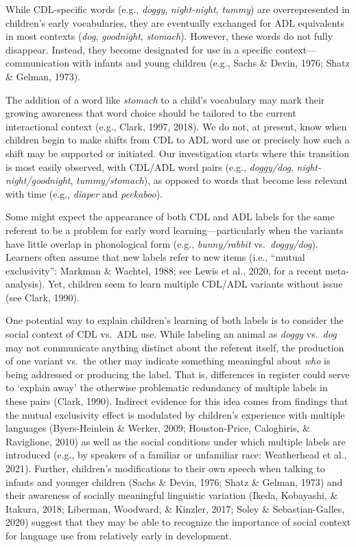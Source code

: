 \documentclass[10pt, letterpaper]{article}
\begin{document}
While CDL-specific words (e.g., \emph{doggy}, \emph{night-night},
\emph{tummy}) are overrepresented in children's early vocabularies, they
are eventually exchanged for ADL equivalents in most contexts
(\emph{dog}, \emph{goodnight}, \emph{stomach}). However, these words do
not fully disappear. Instead, they become designated for use in a
specific context---communication with infants and young children (e.g.,
Sachs \& Devin, 1976; Shatz \& Gelman, 1973).

The addition of a word like \emph{stomach} to a child's vocabulary may
mark their growing awareness that word choice should be tailored to the
current interactional context (e.g., Clark, 1997, 2018). We do not, at
present, know when children begin to make shifts from CDL to ADL word
use or precisely how such a shift may be supported or initiated. Our
investigation starts where this transition is most easily observed, with
CDL/ADL word pairs (e.g., \emph{doggy/dog},
\emph{night-night/goodnight}, \emph{tummy/stomach}), as opposed to words
that become less relevant with time (e.g., \emph{diaper} and
\emph{peekaboo}).

Some might expect the appearance of both CDL and ADL labels for the same
referent to be a problem for early word learning---particularly when the
variants have little overlap in phonological form (e.g.,
\emph{bunny/rabbit} vs.~\emph{doggy/dog}). Learners often assume that
new labels refer to new items (i.e., {``mutual exclusivity''}: Markman
\& Wachtel, 1988; see Lewis et al., 2020, for a recent meta-analysis).
Yet, children seem to learn multiple CDL/ADL variants without issue (see
Clark, 1990).

One potential way to explain children's learning of both labels is to
consider the social context of CDL vs.~ADL use. While labeling an animal
as \emph{doggy} vs.~\emph{dog} may not communicate anything distinct
about the referent itself, the production of one variant vs.~the other
may indicate something meaningful about \emph{who} is being addressed or
producing the label. That is, differences in register could serve to
`explain away' the otherwise problematic redundancy of multiple labels
in these pairs (Clark, 1990). Indirect evidence for this idea comes from
findings that the mutual exclusivity effect is modulated by children's
experience with multiple languages (Byers-Heinlein \& Werker, 2009;
Houston-Price, Caloghiris, \& Raviglione, 2010) as well as the social
conditions under which multiple labels are introduced (e.g., by speakers
of a familiar or unfamiliar race: Weatherhead et al., 2021). Further,
children's modifications to their own speech when talking to infants and
younger children (Sachs \& Devin, 1976; Shatz \& Gelman, 1973) and their
awareness of socially meaningful linguistic variation (Ikeda, Kobayashi,
\& Itakura, 2018; Liberman, Woodward, \& Kinzler, 2017; Soley \&
Sebastian-Galles, 2020) suggest that they may be able to recognize the
importance of social context for language use from relatively early in
development.
\end{document}
